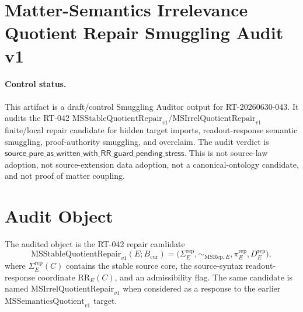 \section*{Matter-Semantics Irrelevance Quotient Repair Smuggling Audit v1}

\paragraph{Control status.}
This artifact is a draft/control Smuggling Auditor output for
RT-20260630-043. It audits the RT-042
\(\mathrm{MSStableQuotientRepair}_{v1}/
\mathrm{MSIrrelQuotientRepair}_{v1}\) finite/local repair candidate for hidden
target imports, readout-response semantic smuggling, proof-authority
smuggling, and overclaim. The audit verdict is
\(\mathsf{source\_pure\_as\_written\_with\_RR\_guard\_pending\_stress}\).
This is not source-law adoption, not source-extension data adoption, not a
canonical-ontology candidate, and not proof of matter coupling.

\newcommand{\Bcur}{B_{\mathrm{cur}}}
\newcommand{\MSAdm}{\mathrm{MSAdm}_{v1}}
\newcommand{\MSStableRepair}{\mathrm{MSStableQuotientRepair}_{v1}}
\newcommand{\MSIrrelRepair}{\mathrm{MSIrrelQuotientRepair}_{v1}}
\newcommand{\MSSig}{\Sigma^{\mathrm{rep}}_E}
\newcommand{\MSRepEq}{\sim_{\mathrm{MSRep},E}}
\newcommand{\MSRepProj}{\pi^{\mathrm{rep}}_E}
\newcommand{\MSRepDisc}{D^{\mathrm{rep}}_E}
\newcommand{\NoTarget}{\mathrm{NoTargetImport}_{v1}}
\newcommand{\NoDetector}{\mathrm{NoDetectorImport}_{v1}}
\newcommand{\NoSE}{\mathrm{NoStressEnergyImport}_{v1}}
\newcommand{\NoAction}{\mathrm{NoMatterActionImport}_{v1}}
\newcommand{\AuditPass}{\mathsf{source\_pure\_as\_written\_with\_RR\_guard\_pending\_stress}}

\newtheorem{definition}{Definition}
\newtheorem{proposition}{Proposition}

\section{Audit Object}

The audited object is the RT-042 repair candidate
\[
  \MSStableRepair(E;\Bcur)=
  \bigl(\MSSig,\MSRepEq,\MSRepProj,\MSRepDisc\bigr),
\]
where \(\MSSig(C)\) contains the stable source core, the source-syntax
readout-response coordinate \(\mathrm{RR}_E(C)\), and an admissibility flag.
The same candidate is named \(\MSIrrelRepair\) when considered as a response
to the earlier \(\mathrm{MSSemanticsQuotient}_{v1}\) target.

